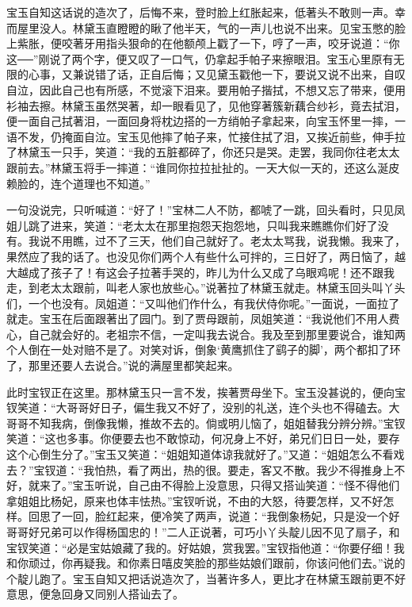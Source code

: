 \begin{parag}
    宝玉自知这话说的造次了，后悔不来，登时脸上红胀起来，低著头不敢则一声。幸而屋里没人。林黛玉直瞪瞪的瞅了他半天，气的一声儿也说不出来。见宝玉憋的脸上紫胀，便咬著牙用指头狠命的在他额颅上戳了一下，哼了一声，咬牙说道：“你这──”刚说了两个字，便又叹了一口气，仍拿起手帕子来擦眼泪。宝玉心里原有无限的心事，又兼说错了话，正自后悔；又见黛玉戳他一下，要说又说不出来，自叹自泣，因此自己也有所感，不觉滚下泪来。要用帕子揩拭，不想又忘了带来，便用衫袖去擦。林黛玉虽然哭著，却一眼看见了，见他穿著簇新藕合纱衫，竟去拭泪，便一面自己拭著泪，一面回身将枕边搭的一方绡帕子拿起来，向宝玉怀里一摔，一语不发，仍掩面自泣。宝玉见他摔了帕子来，忙接住拭了泪，又挨近前些，伸手拉了林黛玉一只手，笑道：“我的五脏都碎了，你还只是哭。走罢，我同你往老太太跟前去。”林黛玉将手一摔道：“谁同你拉拉扯扯的。一天大似一天的，还这么涎皮赖脸的，连个道理也不知道。”
\end{parag}


\begin{parag}
    一句没说完，只听喊道：“好了！”宝林二人不防，都唬了一跳，回头看时，只见凤姐儿跳了进来，笑道：“老太太在那里抱怨天抱怨地，只叫我来瞧瞧你们好了没有。我说不用瞧，过不了三天，他们自己就好了。老太太骂我，说我懒。我来了，果然应了我的话了。也没见你们两个人有些什么可拌的，三日好了，两日恼了，越大越成了孩子了！有这会子拉著手哭的，昨儿为什么又成了乌眼鸡呢！还不跟我走，到老太太跟前，叫老人家也放些心。”说著拉了林黛玉就走。林黛玉回头叫丫头们，一个也没有。凤姐道：“又叫他们作什么，有我伏侍你呢。”一面说，一面拉了就走。宝玉在后面跟著出了园门。到了贾母跟前，凤姐笑道：“我说他们不用人费心，自己就会好的。老祖宗不信，一定叫我去说合。我及至到那里要说合，谁知两个人倒在一处对赔不是了。对笑对诉，倒象‘黄鹰抓住了鹞子的脚’，两个都扣了环了，那里还要人去说合。”说的满屋里都笑起来。
\end{parag}


\begin{parag}
    此时宝钗正在这里。那林黛玉只一言不发，挨著贾母坐下。宝玉没甚说的，便向宝钗笑道：“大哥哥好日子，偏生我又不好了，没别的礼送，连个头也不得磕去。大哥哥不知我病，倒像我懒，推故不去的。倘或明儿恼了，姐姐替我分辨分辨。”宝钗笑道：“这也多事。你便要去也不敢惊动，何况身上不好，弟兄们日日一处，要存这个心倒生分了。”宝玉又笑道：“姐姐知道体谅我就好了。”又道：“姐姐怎么不看戏去？”宝钗道：“我怕热，看了两出，热的很。要走，客又不散。我少不得推身上不好，就来了。”宝玉听说，自己由不得脸上没意思，只得又搭讪笑道：“怪不得他们拿姐姐比杨妃，原来也体丰怯热。”宝钗听说，不由的大怒，待要怎样，又不好怎样。回思了一回，脸红起来，便冷笑了两声，说道：“我倒象杨妃，只是没一个好哥哥好兄弟可以作得杨国忠的！”二人正说著，可巧小丫头靛儿因不见了扇子，和宝钗笑道：“必是宝姑娘藏了我的。好姑娘，赏我罢。”宝钗指他道：“你要仔细！我和你顽过，你再疑我。和你素日嘻皮笑脸的那些姑娘们跟前，你该问他们去。”说的个靛儿跑了。宝玉自知又把话说造次了，当著许多人，更比才在林黛玉跟前更不好意思，便急回身又同别人搭讪去了。
\end{parag}


